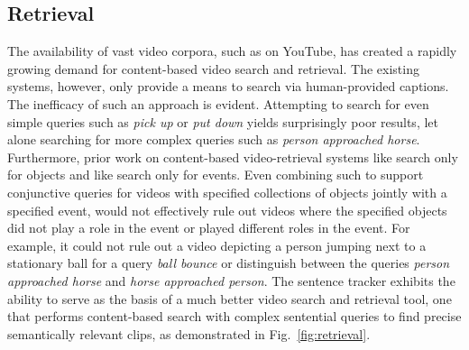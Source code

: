 \vspace*{-2ex}
\subsection{Retrieval}
\label{subsec:retrieval}
\vspace*{-2ex}

The availability of vast video corpora, such as on YouTube, has created a
rapidly growing demand for content-based video search and retrieval.
%
The existing systems, however, only provide a means to search via human-provided
captions.
%
The inefficacy of such an approach is evident.
%
Attempting to search for even simple queries such as \emph{pick up} or
\emph{put down} yields surprisingly poor results, let alone searching for more
complex queries such as \emph{person approached horse}.
%
Furthermore, prior work on content-based video-retrieval systems like
\citet{Sivic2003} search only for objects and like \citet{laptev:08} search
only for events.
%
Even combining such to support conjunctive queries for videos with specified
collections of objects jointly with a specified event, would not effectively
rule out videos where the specified objects did not play a role in the event or
played different roles in the event.
%
For example, it could not rule out a video depicting a person jumping next to a
stationary ball for a query \emph{ball bounce} or distinguish between the
queries \emph{person approached horse} and \emph{horse approached person}.
%
The sentence tracker exhibits the ability to serve as the basis of a much
better video search and retrieval tool, one that performs content-based search
with complex sentential queries to find precise semantically relevant clips,
as demonstrated in Fig.~\ref{fig:retrieval}.


